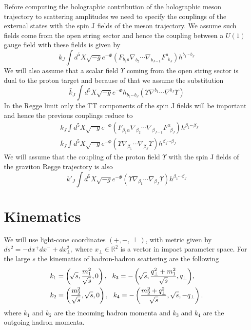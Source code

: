 \documentclass[10 pt]{article}
\begin{document}
Before computing the holographic contribution of the holographic meson trajectory to scattering amplitudes we need to specify the couplings of the external states with the spin J fields of the meson trajectory. We assume such fields come from the open string sector and hence the coupling between a $U(1)$ gauge field  with these fields is given by
\begin{equation}
k_J \int d^5X \sqrt{-g} e^{-\Phi} \left(F_{b_1 a} \nabla_{b_2} \cdots \nabla_{b_{J-1}} F^{a}_{\, \, \, b_J}  \right) h^{b_1 \cdots b_J}
\end{equation}
We will also assume that a scalar field $\Upsilon$ coming from the open string sector is dual to the proton target and because of that we assume the substitution
\begin{equation}
\bar{k}_J \int d^5 X \sqrt{-g} e^{-\Phi} h_{b_1 \cdots b_J} \left( \Upsilon \nabla^{b_1} \cdots \nabla^{b_J} \Upsilon \right)
\end{equation}
In the Regge limit only the TT components of the spin J fields will be important and hence the previous couplings reduce to 
\begin{align}
&k_J \int d^5X \sqrt{-g} e^{-\Phi} \left(F_{\beta_1 \alpha} \nabla_{\beta_2} \cdots \nabla_{\beta_{J-1}} F^{\alpha}_{\, \, \, \beta_J}  \right) h^{\beta_1 \cdots \beta_J} \\
&\bar{k}_J \int d^5 X \sqrt{-g} e^{-\Phi}  \left( \Upsilon \nabla_{\beta_1} \cdots \nabla_{\beta_J} \Upsilon \right)h^{\beta_1 \cdots \beta_J}
\label{eq:meson_spin_J_couplings}
\end{align}
We will assume that the coupling of the proton field $\Upsilon$ with the spin J fields of the graviton Regge trajectory is also
\begin{equation}
k'_J \int d^5 X \sqrt{-g} e^{-\Phi}  \left( \Upsilon \nabla_{\beta_1} \cdots \nabla_{\beta_J} \Upsilon \right)h^{\beta_1 \cdots \beta_J}
\label{eq:pomeron_spin_J_couplings}
\end{equation}

\section{Kinematics}
We will use light-cone coordinates $\left( +, -, \perp \right)$, with metric given by $ds^2 = - dx^{+} dx^{-} + dx_\perp^2$, where $x_\perp \in \mathbb{R}^2$ is a vector in impact parameter space.
For the large $s$ the kinematics of hadron-hadron scattering are the following
\begin{align}
\label{eq:pp_kinematics}
&k_1=\left(\!\sqrt{s},\frac{m_1^2}{\sqrt{s}} ,0\right),\  \ k_3=-\left(\!\sqrt{s},\frac{ q_\perp^2 +m_1^2}{\sqrt{s}} , q_\perp \right)\!,\\
&k_2=\left(\frac{m_2^2}{\sqrt{s}},\sqrt{s} ,0\right),\  \ k_4=-\left(\frac{m_2^2+ q_\perp^2}{\sqrt{s}},\sqrt{s} ,-q_\perp \right).\notag
\end{align}
where $k_1$ and $k_2$ are the incoming hadron momenta and $k_3$ and $k_4$ are the outgoing hadron momenta.
\end{document}
